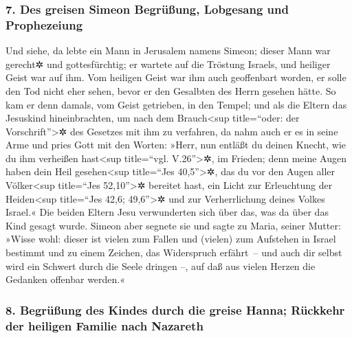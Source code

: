 \hypertarget{des-greisen-simeon-begruxfcuxdfung-lobgesang-und-prophezeiung}{%
\subsubsection{7. Des greisen Simeon Begrüßung, Lobgesang und
Prophezeiung}\label{des-greisen-simeon-begruxfcuxdfung-lobgesang-und-prophezeiung}}

 Und siehe, da lebte ein Mann in Jerusalem namens Simeon;
dieser Mann war gerecht✲ und gottesfürchtig; er wartete auf die Tröstung
Israels, und heiliger Geist war auf ihm.  Vom heiligen
Geist war ihm auch geoffenbart worden, er solle den Tod nicht eher
sehen, bevor er den Gesalbten des Herrn gesehen hätte. 
So kam er denn damals, vom Geist getrieben, in den Tempel; und als die
Eltern das Jesuskind hineinbrachten, um nach dem Brauch\textless sup
title=``oder: der Vorschrift''\textgreater✲ des Gesetzes mit ihm zu
verfahren,  da nahm auch er es in seine Arme und pries
Gott mit den Worten:  »Herr, nun entläßt du deinen
Knecht, wie du ihm verheißen hast\textless sup title=``vgl.
V.26''\textgreater✲, im Frieden;  denn meine Augen haben
dein Heil gesehen\textless sup title=``Jes 40,5''\textgreater✲,
 das du vor den Augen aller Völker\textless sup
title=``Jes 52,10''\textgreater✲ bereitet hast,  ein
Licht zur Erleuchtung der Heiden\textless sup title=``Jes 42,6;
49,6''\textgreater✲ und zur Verherrlichung deines Volkes Israel.«
 Die beiden Eltern Jesu verwunderten sich über das, was
da über das Kind gesagt wurde.  Simeon aber segnete sie
und sagte zu Maria, seiner Mutter: »Wisse wohl: dieser ist vielen zum
Fallen und (vielen) zum Aufstehen in Israel bestimmt und zu einem
Zeichen, das Widerspruch erfährt~--  und auch dir selbst
wird ein Schwert durch die Seele dringen --, auf daß aus vielen Herzen
die Gedanken offenbar werden.«

\hypertarget{begruxfcuxdfung-des-kindes-durch-die-greise-hanna-ruxfcckkehr-der-heiligen-familie-nach-nazareth}{%
\subsubsection{8. Begrüßung des Kindes durch die greise Hanna; Rückkehr
der heiligen Familie nach
Nazareth}\label{begruxfcuxdfung-des-kindes-durch-die-greise-hanna-ruxfcckkehr-der-heiligen-familie-nach-nazareth}}


